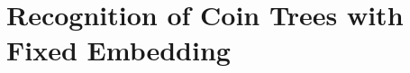 \documentclass[runningheads]{article}
\begin{document}
%
%
%
%

\section{Recognition of Coin Trees with Fixed Embedding\label{sec:disk}}
\end{document}
